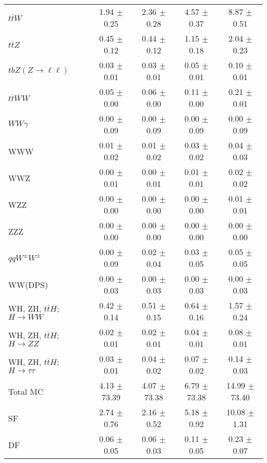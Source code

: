 \begin{tabular}{l|cccc}
                   $t\overline{t}W$ &  1.94 $\pm$  0.25 &  2.36 $\pm$  0.28 &  4.57 $\pm$  0.37 &  8.87 $\pm$  0.51 \\
                   $t\overline{t}Z$ &  0.45 $\pm$  0.12 &  0.44 $\pm$  0.12 &  1.15 $\pm$  0.18 &  2.04 $\pm$  0.23 \\
    $tbZ (Z \rightarrow \ell \ell)$ &  0.03 $\pm$  0.01 &  0.03 $\pm$  0.01 &  0.05 $\pm$  0.01 &  0.10 $\pm$  0.01 \\
                  $t\overline{t}WW$ &  0.05 $\pm$  0.00 &  0.06 $\pm$  0.00 &  0.11 $\pm$  0.00 &  0.21 $\pm$  0.01 \\
                         $WW\gamma$ &  0.00 $\pm$  0.09 &  0.00 $\pm$  0.09 &  0.00 $\pm$  0.09 &  0.00 $\pm$  0.09 \\
                                WWW &  0.01 $\pm$  0.02 &  0.01 $\pm$  0.02 &  0.03 $\pm$  0.02 &  0.04 $\pm$  0.03 \\
                                WWZ &  0.00 $\pm$  0.01 &  0.00 $\pm$  0.01 &  0.01 $\pm$  0.01 &  0.02 $\pm$  0.02 \\
                                WZZ &  0.00 $\pm$  0.00 &  0.00 $\pm$  0.00 &  0.00 $\pm$  0.00 &  0.01 $\pm$  0.01 \\
                                ZZZ &  0.00 $\pm$  0.00 &  0.00 $\pm$  0.00 &  0.00 $\pm$  0.00 &  0.00 $\pm$  0.00 \\
                 $qqW^{\pm}W^{\pm}$ &  0.00 $\pm$  0.09 &  0.02 $\pm$  0.04 &  0.03 $\pm$  0.05 &  0.05 $\pm$  0.05 \\
                            WW(DPS) &  0.00 $\pm$  0.03 &  0.00 $\pm$  0.03 &  0.00 $\pm$  0.03 &  0.00 $\pm$  0.03 \\
WH, ZH, $t\bar{t}H$; $H \rightarrow WW$ &  0.42 $\pm$  0.14 &  0.51 $\pm$  0.15 &  0.64 $\pm$  0.16 &  1.57 $\pm$  0.24 \\
WH, ZH, $t\bar{t}H$; $H \rightarrow ZZ$ &  0.02 $\pm$  0.01 &  0.02 $\pm$  0.01 &  0.04 $\pm$  0.01 &  0.08 $\pm$  0.01 \\
WH, ZH, $t\bar{t}H$; $H \rightarrow \tau\tau$ &  0.03 $\pm$  0.01 &  0.04 $\pm$  0.02 &  0.07 $\pm$  0.02 &  0.14 $\pm$  0.03 \\
\hline\hline
                           Total MC &  4.13 $\pm$ 73.39 &  4.07 $\pm$ 73.38 &  6.79 $\pm$ 73.38 & 14.99 $\pm$ 73.40 \\
\hline
                                 SF &  2.74 $\pm$  0.76 &  2.16 $\pm$  0.52 &  5.18 $\pm$  0.92 & 10.08 $\pm$  1.31 \\
                                 DF &  0.06 $\pm$  0.05 &  0.06 $\pm$  0.03 &  0.11 $\pm$  0.05 &  0.23 $\pm$  0.07 \\

\end{tabular}

